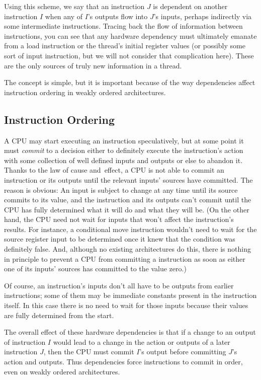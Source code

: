 \documentclass[10]{article}
\begin{document}
Using this scheme, we say that an instruction $J$ is dependent on
another instruction $I$ when any of $I$'s outputs flow into $J$'s inputs,
perhaps indirectly via some intermediate instructions.
Tracing back the flow of information between instructions, you can
see that any hardware dependency must ultimately emanate from a load
instruction or the thread's initial register values (or possibly some sort of
input instruction, but we will not consider that complication here).
These are the only sources of truly new information in a thread.

The concept is simple, but it is important because of the way
dependencies affect instruction ordering in weakly ordered architectures.

\subsection{Instruction Ordering}
\label{sec:Instruction Ordering}

A CPU may start executing an instruction speculatively, but at some
point it must \emph{commit} to a decision either to definitely execute the
instruction's action with some collection of well defined inputs and outputs
or else to abandon it.
Thanks to the law of cause and~effect, a CPU is not able to commit an
instruction or its outputs until the relevant inputs' sources have committed.
The reason is obvious: An input is subject to change at any time until
its source commits to its value,
and the instruction and its outputs can't commit until the CPU has fully
determined what it will do and what they will be.
(On the other hand, the CPU need not wait for inputs that won't affect
the instruction's results.
For instance, a conditional move instruction wouldn't need to wait for
the source register input to be determined once it knew that the
condition was definitely false.
And, although no existing architectures do this, there is nothing
in principle to prevent a CPU from committing a 
instruction as soon as either one of its inputs' sources has committed to the
value zero.)

Of course, an instruction's inputs don't all have to be outputs from
earlier instructions; some of them may be immediate constants present
in the instruction itself.
In this case there is no need to wait for those inputs because
their values are fully determined from the start.

The overall effect of these hardware dependencies is that if a change to an
output of instruction $I$ would lead to a change in the action or outputs of
a later instruction $J$, then the CPU must commit $I$'s output before
committing $J$'s action and outputs.
Thus dependencies force instructions to commit in order, even on
weakly ordered architectures.
\end{document}
